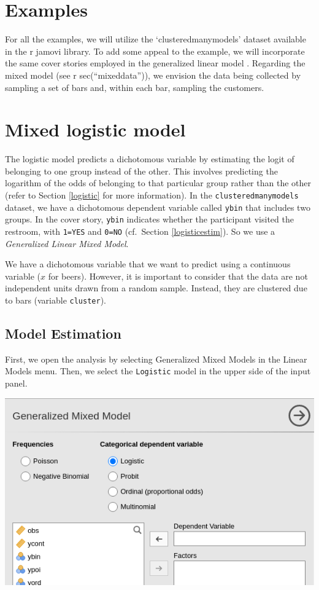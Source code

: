 \documentclass[
]{book}
\begin{document}
\hypertarget{examples}{%
\section{Examples}\label{examples}}

For all the examples, we will utilize the `clusteredmanymodels' dataset available in the r jamovi library. To add some appeal to the example, we will incorporate the same cover stories employed in the generalized linear model . Regarding the mixed model (see r sec(``mixeddata'')), we envision the data being collected by sampling a set of bars and, within each bar, sampling the customers.

\hypertarget{mixed-logistic-model}{%
\section{Mixed logistic model}\label{mixed-logistic-model}}

The logistic model predicts a dichotomous variable by estimating the logit of belonging to one group instead of the other. This involves predicting the logarithm of the odds of belonging to that particular group rather than the other (refer to Section \ref{logistic} for more information). In the \texttt{clusteredmanymodels} dataset, we have a dichotomous dependent variable called \texttt{ybin} that includes two groups. In the cover story, \texttt{ybin} indicates whether the participant visited the restroom, with \texttt{1=YES} and \texttt{0=NO} (cf.~Section \ref{logisticestim}). So we use a \emph{Generalized Linear Mixed Model}.

We have a dichotomous variable that we want to predict using a continuous variable (\(x\) for beers). However, it is important to consider that the data are not independent units drawn from a random sample. Instead, they are clustered due to bars (variable \texttt{cluster}).

\hypertarget{model-estimation-3}{%
\subsection{Model Estimation}\label{model-estimation-3}}

First, we open the analysis by selecting {Generalized Mixed Models} in the {Linear Models} menu. Then, we select the \texttt{Logistic} model in the upper side of the input panel.

\includegraphics[width=0.8\linewidth]{bookletpics/5_logistic_input1}
\end{document}
